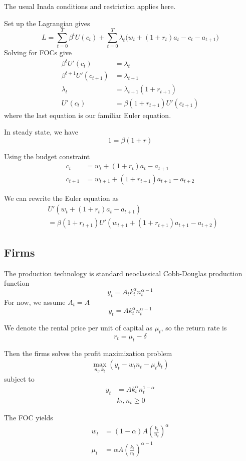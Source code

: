 \documentclass[twocolumn, fleqn]{article}
\begin{document}
	The usual Inada conditions and restriction applies here.
	
	Set up the Lagrangian gives 
	\[
	L = \sum_{t=0}^T \beta^t U(c_t) + \sum_{t=0}^T \lambda_t \big(w_t + (1 + r_t)a_t - c_t - a_{t+1}\big)
	\]
	Solving for FOCs give
	\begin{align*}
	\beta^t U'(c_t) &= \lambda_t \\
	\beta^{t+1} U'(c_{t+1}) &= \lambda_{t+1} \\
	\lambda_t &= \lambda_{t+1} (1 + r_{t+1}) \\
	U'(c_t) &= \beta (1 + r_{t+1}) U'(c_{t+1})
	\end{align*}
	where the last equation is our familiar Euler equation.
	
	In steady state, we have
	\[1 = \beta (1+r)\]
	
	Using the budget constraint
	\begin{align*}
	c_t &= w_t + (1 + r_t)a_t - a_{t+1} \\
	c_{t+1} &= w_{t+1} + (1 + r_{t+1})a_{t+1} - a_{t+2} 
	\end{align*}
	
	We can rewrite the Euler equation as 
	\begin{align*}
			&U'(w_t + (1 + r_t)a_t - a_{t+1}) \\
			&= \beta (1 + r_{t+1}) U'(w_{t+1} + (1 + r_{t+1})a_{t+1} - a_{t+2})
	\end{align*}
	
	\subsection{Firms}
	The production technology is standard neoclassical Cobb-Douglas production function
	\[y_t = A_t k_t^\alpha n_t^{\alpha-1}\]
	For now, we assume $A_t =A$
	\[y_t = A k_t^\alpha n_t^{\alpha-1}\]
	
	We denote the rental price per unit of capital as $\mu_t$, so the return rate is 
	\[r_t = \mu_t -\delta\]
	
	Then the firms solves the profit maximization problem
	\begin{align*}
		\max_{n_t, k_t} (y_t - w_t n_t -\mu_t k_t)
	\end{align*}
	subject to 
	\begin{align*}
		y_t &= Ak_t^\alpha n_t^{1-\alpha}\\
		&k_t, n_t \geq 0
	\end{align*}
	
	The FOC yields 
	\begin{align*}
		w_t &= (1 - \alpha)A \left(\frac{k_t}{n_t}\right)^\alpha \\
		\mu_t &= \alpha A \left(\frac{k_t}{n_t}\right)^{\alpha-1} 
	\end{align*}
	
\end{document}
